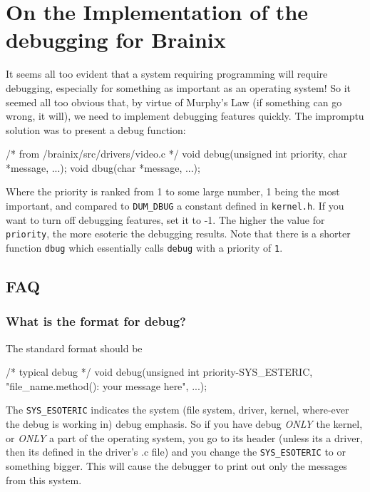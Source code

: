
\chapter{On the Implementation of the debugging for Brainix}

%

It seems all too evident that a system requiring programming will require debugging, especially for something as important as an operating system! So it seemed all too obvious that, by virtue of Murphy's Law (if something can go wrong, it will), we need to implement debugging features quickly. The impromptu solution was to present a debug function:
\begin{code}
/* from /brainix/src/drivers/video.c */
void debug(unsigned int priority, char *message, ...);
void dbug(char *message, ...);
\end{code}
Where the priority is ranked from 1 to some large number, 1 being the most important, and compared to \verb|DUM_DBUG| a constant defined in \verb|kernel.h|. If you want to turn off debugging features, set it to -1. The higher the value for \verb|priority|, the more esoteric the debugging results. Note that there is a shorter function \verb|dbug| which essentially calls \verb|debug| with a priority of \verb|1|.
\section{FAQ}
\subsection{What is the format for debug?}
The standard format should be
\begin{code}
/* typical debug */
void debug(unsigned int priority-SYS_ESTERIC, "file_name.method(): your message here", ...);
\end{code}
The \verb|SYS_ESOTERIC| indicates the system (file system, driver, kernel, where-ever the debug is working in) debug emphasis. So if you have debug \emph{ONLY} the kernel, or \emph{ONLY} a part of the operating system, you go to its header (unless its a driver, then its defined in the driver's .c file) and you change the \verb|SYS_ESOTERIC| to  or something bigger. This will cause the debugger to print out only the messages from this system.
